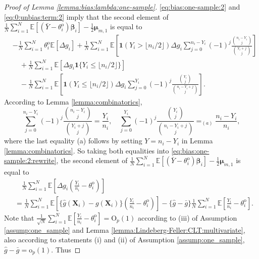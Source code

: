 \documentclass[12pt,letterpaper]{article}
\begin{document}
\begin{proof}[Proof of Lemma \ref{lemma:bias:lambda:one-sample}]
\eqref{eq:bias:one-sample:2} and \eqref{eq:0:unbias:term:2} imply that the second element of $\displaystyle\frac{1}{N}\sum_{i=1}^N\mathbb{E}\left[\left(\bar{Y}-\theta_i^{\mathrm{o}}\right)\boldsymbol{\beta}_i\right]-\frac{1}{2}\boldsymbol{\mu}_{m,1}$ is equal to
\begin{equation}\label{eq:bias:one-sample:2:rewrite}
\begin{array}{rl}
&\displaystyle-\frac{1}{N}\sum_{i=1}^N\theta_i^{\mathrm{o}}\mathbb{E}\left[\Delta g_i\right]+\frac{1}{N}\sum_{i=1}^N\mathbb{E}\left[\mathbf{1}(Y_{i} > \lfloor n_i/2\rfloor)\Delta g_i\sum_{j=0}^{n_{i}-Y_{i}}(-1)^{j}\frac{\binom{n_i-Y_i}{j}}{\binom{Y_i+j}{j}}\right]\\
&\displaystyle\quad+\frac{1}{N}\sum_{i=1}^N\mathbb{E}\left[\Delta g_i\mathbf{1}\{Y_i\leq \lfloor n_i/2\rfloor\}\right]\\
&\displaystyle\quad-\frac{1}{N}\sum_{i=1}^N\mathbb{E}\left[\mathbf{1}(Y_{i}\leq \lfloor n_i/2\rfloor)\Delta g_i\sum_{j=0}^{Y_{i}}(-1)^{j}\frac{\binom{Y_i}{j}}{\binom{n_i-Y_i+j}{j}}\right].
\end{array}
\end{equation}
According to Lemma \ref{lemma:combinatorics}, 
$$\sum_{j=0}^{n_{i}-Y_{i}}(-1)^{j}\frac{\binom{n_i-Y_i}{j}}{\binom{Y_i+j}{j}}=\frac{Y_i}{n_i},\quad \sum_{j=0}^{Y_{i}}(-1)^{j}\frac{\binom{Y_i}{j}}{\binom{n_i-Y_i+j}{j}}=_{(a)}\frac{n_i-Y_i}{n_i},$$
where the last equality (a) follows by setting $Y=n_i-Y_i$ in Lemma \ref{lemma:combinatorics}. So taking both equalities into \eqref{eq:bias:one-sample:2:rewrite}, the second element of $\displaystyle\frac{1}{N}\sum_{i=1}^N\mathbb{E}\left[\left(\bar{Y}-\theta_i^{\mathrm{o}}\right)\boldsymbol{\beta}_i\right]-\frac{1}{2}\boldsymbol{\mu}_{m,1}$ is equal to 
\begin{equation}\label{eq:ele:second:one-sample}
\begin{array}{rl}
&\displaystyle\quad\frac{1}{N}\sum_{i=1}^N\mathbb{E}\left[\Delta g_i\left(\frac{Y_i}{n_i}-\theta_i^{\mathrm{o}}\right)\right]\\
&\displaystyle=\frac{1}{N}\sum_{i=1}^N\mathbb{E}\left[\{\hat{g}(\mathbf{X}_i)-g(\mathbf{X}_i)\}\left(\frac{Y_i}{n_i}-\theta_i^{\mathrm{o}}\right)\right]-\{\hat{g}-\bar{g}\}\frac{1}{N}\sum_{i=1}^N\mathbb{E}\left[\frac{Y_i}{n_i}-\theta_i^{\mathrm{o}}\right].
\end{array}
\end{equation}
Note that $\displaystyle\frac{1}{\sqrt{N}}\sum_{i=1}^N\mathbb{E}\left[\frac{Y_i}{n_i}-\theta_i^{\mathrm{o}}\right]=\mathrm{O}_p(1)$ according to (iii) of Assumption \ref{assump:one_sample} and Lemma \ref{lemma:Lindeberg-Feller:CLT:multivariate}, also according to statements (i) and (ii) of Assumption \ref{assump:one_sample}, $\hat{g}-\bar{g}=\mathrm{o}_p(1)$. Thus

\end{proof}
\end{document}
